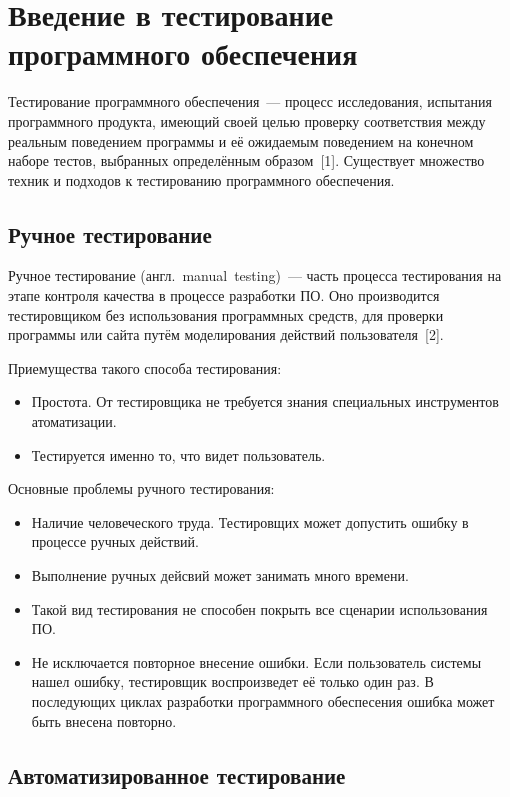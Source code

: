 \section{Введение в тестирование программного обеспечения} \label{section_1}

Тестирование программного обеспечения~--- процесс исследования, испытания программного продукта, имеющий своей целью проверку соответствия между реальным поведением программы и её ожидаемым поведением на конечном наборе тестов, выбранных определённым образом~[1]. Существует множество техник и подходов к тестированию программного обеспечения.  

\subsection{Ручное тестирование} \label{subsection_11}

Ручное тестирование (англ.~manual~testing)~--- часть процесса тестирования на этапе контроля качества в процессе разработки ПО. Оно производится тестировщиком без использования программных средств, для проверки программы или сайта путём моделирования действий пользователя~[2]. 

Приемущества такого способа тестирования:

\begin{itemize}
	\item Простота. От тестировщика не требуется знания специальных инструментов атоматизации.
	\item Тестируется именно то, что видет пользователь.
\end{itemize} 

Основные проблемы ручного тестирования:
\begin{itemize}
	\item Наличие человеческого труда. Тестировщих может допустить ошибку в процессе ручных действий.
	\item Выполнение ручных дейсвий может занимать много времени.
	\item Такой вид тестирования не способен покрыть все сценарии использования ПО. 
	\item Не исключается повторное внесение ошибки. Если пользователь системы нашел ошибку, тестировщик воспроизведет её только один раз. В последующих циклах разработки программного обеспесения ошибка может быть внесена повторно.
\end{itemize} 


\subsection{Автоматизированное тестирование} \label{subsection_12}
 
